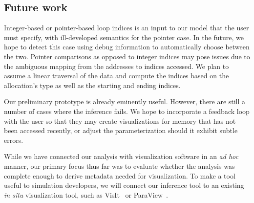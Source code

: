 \subsection{Future work}

Integer-based or pointer-based loop indices is an input to our model
that the user must specify, with ill-developed semantics for the
pointer case.  In the future, we hope to detect this case using
debug information to automatically choose between the two.  Pointer
comparisons as opposed to integer indices may pose issues due to the
ambiguous mapping from the addresses to indices accessed.  We plan to
assume a linear traversal of the data and compute the indices based on
the allocation's type as well as the starting and ending indices.

Our preliminary prototype is already eminently useful.  However, there
are still a number of cases where the inference fails.  We hope to
incorporate a feedback loop with the user so that they may create
visualizations for memory that has not been accessed recently, or
adjust the parameterization should it exhibit subtle errors.

While we have connected our analysis with visualization software in an
\textit{ad hoc} manner, our primary focus thus far was to evaluate
whether the analysis was complete enough to derive metadata needed for
visualization.  To make a tool useful to simulation developers, we will
connect our inference tool to an existing \textit{in situ}
visualization tool, such as VisIt~\cite{Childs:2012:VisIt} or
ParaView~\cite{Fabian:2011:Catalyst}.

%
%
